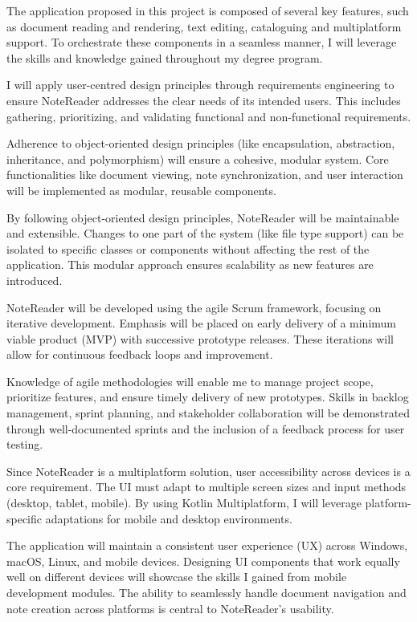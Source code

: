 The application proposed in this project is composed of several key features, such as document reading and rendering, text editing, cataloguing and multiplatform support. To orchestrate these components in a seamless manner, I will leverage the skills and knowledge gained throughout my degree program. 

I will apply user-centred design principles through requirements engineering to ensure NoteReader addresses the clear needs of its intended users. This includes gathering, prioritizing, and validating functional and non-functional requirements.

Adherence to object-oriented design principles (like encapsulation, abstraction, inheritance, and polymorphism) will ensure a cohesive, modular system. Core functionalities like document viewing, note synchronization, and user interaction will be implemented as modular, reusable components.

By following object-oriented design principles, NoteReader will be maintainable and extensible. Changes to one part of the system (like file type support) can be isolated to specific classes or components without affecting the rest of the application. This modular approach ensures scalability as new features are introduced.

NoteReader will be developed using the agile Scrum framework, focusing on iterative development. Emphasis will be placed on early delivery of a minimum viable product (MVP) with successive prototype releases. These iterations will allow for continuous feedback loops and improvement.

Knowledge of agile methodologies will enable me to manage project scope, prioritize features, and ensure timely delivery of new prototypes. Skills in backlog management, sprint planning, and stakeholder collaboration will be demonstrated through well-documented sprints and the inclusion of a feedback process for user testing.

Since NoteReader is a multiplatform solution, user accessibility across devices is a core requirement. The UI must adapt to multiple screen sizes and input methods (desktop, tablet, mobile). By using Kotlin Multiplatform, I will leverage platform-specific adaptations for mobile and desktop environments.

The application will maintain a consistent user experience (UX) across Windows, macOS, Linux, and mobile devices. Designing UI components that work equally well on different devices will showcase the skills I gained from mobile development modules. The ability to seamlessly handle document navigation and note creation across platforms is central to NoteReader's usability.

